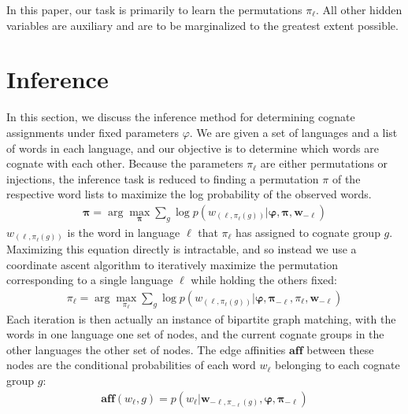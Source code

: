 \documentclass[11pt,a4paper]{article}
\begin{document}
In this paper, our task is primarily to learn the permutations
$\pi_\ell$. All other hidden variables are auxiliary and are to be
marginalized to the greatest extent possible.

\section{Inference}
In this section, we discuss the inference method for determining
cognate assignments under fixed parameters $\varphi$.  We are given a
set of languages and a list of words in each language, and our
objective is to determine which words are cognate with each other.
Because the parameters $\pi_\ell$ are either permutations or injections,
the inference task is reduced to finding a permutation $\pi$ of the
respective word lists to maximize the log probability of the observed
words.
\begin{equation*}
  \begin{split}
    \mathbf{\pi} = \arg\!\max_{\mathbf \pi} \sum_{g} \log p(w_{(\ell,\pi_\ell(g))}|\mathbf \varphi,\mathbf \pi, \mathbf{w}_{-\ell})
   \end{split}
 \end{equation*}
$w_{(\ell,\pi_\ell(g))}$ is the word in language $\ell$ that
$\pi_\ell$ has assigned to cognate group $g$. Maximizing this equation
directly is intractable, and so instead we use a coordinate ascent
algorithm to iteratively maximize the permutation corresponding to
a single language $\ell$ while holding the others fixed:
\begin{equation*}
  \begin{split}
    \pi_\ell = \arg\!\max_{\pi_\ell} \sum_{g} \log p(w_{(\ell,\pi_\ell(g))}|\mathbf \varphi,\mathbf \pi_{-\ell},\pi_\ell, \mathbf{w}_{-\ell})
  \end{split}
\end{equation*}
Each iteration is then actually an instance of bipartite graph
matching, with the words in one language one set of nodes, and the
current cognate groups in the other languages the other set of
nodes. The edge affinities $\mathbf{aff}$ between these nodes are the conditional
probabilities of each word $w_\ell$ belonging to each cognate group $g$:
\begin{equation*}
  \begin{split}
    \mathbf{aff}(w_\ell,g) = p(w_\ell|\mathbf w_{-\ell,\pi_{-\ell}(g)},\mathbf \varphi,\mathbf\pi_{-\ell})
   \end{split}
 \end{equation*}
\end{document}
